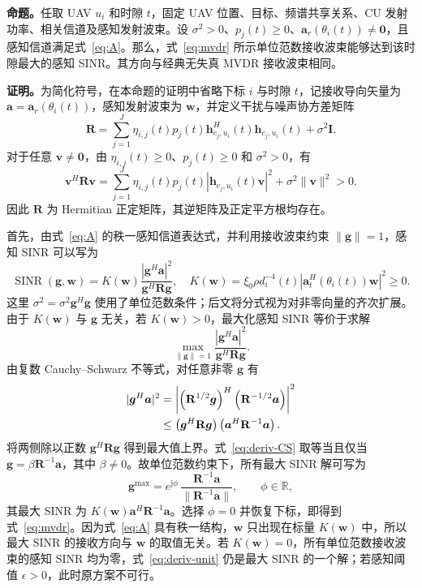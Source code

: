 \documentclass[11pt,a4paper]{ctexart}
\begin{document}
\noindent\textbf{命题。}任取 UAV $u_i$ 和时隙 $t$，固定 UAV 位置、目标、频谱共享关系、CU 发射功率、相关信道及感知发射波束。设 $\sigma^2>0$、$p_j(t)\ge0$、$\bm a_r(\theta_i(t))\ne\bm0$，且感知信道满足式~\eqref{eq:A}。那么，式~\eqref{eq:mvdr} 所示单位范数接收波束能够达到该时隙最大的感知 SINR。其方向与经典无失真 MVDR 接收波束相同。

\medskip
\noindent\textbf{证明。}为简化符号，在本命题的证明中省略下标 $i$ 与时隙 $t$，记接收导向矢量为 $\bm a=\bm a_r(\theta_i(t))$，感知发射波束为 $\bm w$，并定义干扰与噪声协方差矩阵
\begin{equation}\label{eq:deriv-R}
\mathbf R=\sum_{j=1}^J\eta_{i,j}(t)p_j(t)
\bm h_{c_j,u_i}^{H}(t)\bm h_{c_j,u_i}(t)+\sigma^2\mathbf I.
\end{equation}
对于任意 $\bm v\ne\bm0$，由 $\eta_{i,j}(t)\ge0$、$p_j(t)\ge0$ 和 $\sigma^2>0$，有
\begin{equation}\label{eq:deriv-positive}
\bm v^H\mathbf R\bm v
=\sum_{j=1}^J\eta_{i,j}(t)p_j(t)
\left|\bm h_{c_j,u_i}(t)\bm v\right|^2+\sigma^2\|\bm v\|^2>0.
\end{equation}
因此 $\mathbf R$ 为 Hermitian 正定矩阵，其逆矩阵及正定平方根均存在。

首先，由式~\eqref{eq:A} 的秩一感知信道表达式，并利用接收波束约束 $\|\bm g\|=1$，感知 SINR 可以写为
\begin{equation}\label{eq:deriv-sinr}
\operatorname{SINR}(\bm g,\bm w)
= K(\bm w)\frac{|\bm g^H\bm a|^2}{\bm g^H\mathbf R\bm g},
\quad
K(\bm w)=\xi_0\rho d_i^{-4}(t)
\left|\bm a_t^H(\theta_i(t))\bm w\right|^2\ge0.
\end{equation}
这里 $\sigma^2=\sigma^2\bm g^H\bm g$ 使用了单位范数条件；后文将分式视为对非零向量的齐次扩展。由于 $K(\bm w)$ 与 $\bm g$ 无关，若 $K(\bm w)>0$，最大化感知 SINR 等价于求解
\begin{equation}\label{eq:deriv-max}
\max_{\|\bm g\|=1}
\frac{|\bm g^H\bm a|^2}{\bm g^H\mathbf R\bm g}.
\end{equation}
由复数 Cauchy--Schwarz 不等式，对任意非零 $\bm g$ 有
\begin{align}\label{eq:deriv-CS}
|\bm g^H\bm a|^2
&=\left|\left(\mathbf R^{1/2}\bm g\right)^H
\left(\mathbf R^{-1/2}\bm a\right)\right|^2\notag\\
&\le \left(\bm g^H\mathbf R\bm g\right)
\left(\bm a^H\mathbf R^{-1}\bm a\right).
\end{align}
将两侧除以正数 $\bm g^H\mathbf R\bm g$ 得到最大值上界。式~\eqref{eq:deriv-CS} 取等当且仅当 $\bm g=\beta\mathbf R^{-1}\bm a$，其中 $\beta\ne0$。故单位范数约束下，所有最大 SINR 解可写为
\begin{equation}\label{eq:deriv-unit}
\bm g^{\max}=e^{\mathrm j\phi}\,
\frac{\mathbf R^{-1}\bm a}{\|\mathbf R^{-1}\bm a\|},
\qquad \phi\in\mathbb R,
\end{equation}
其最大 SINR 为 $K(\bm w)\bm a^H\mathbf R^{-1}\bm a$。选择 $\phi=0$ 并恢复下标，即得到式~\eqref{eq:mvdr}。因为式~\eqref{eq:A} 具有秩一结构，$\bm w$ 只出现在标量 $K(\bm w)$ 中，所以最大 SINR 的接收方向与 $\bm w$ 的取值无关。若 $K(\bm w)=0$，所有单位范数接收波束的感知 SINR 均为零，式~\eqref{eq:deriv-unit} 仍是最大 SINR 的一个解；若感知阈值 $\epsilon>0$，此时原方案不可行。
\end{document}
